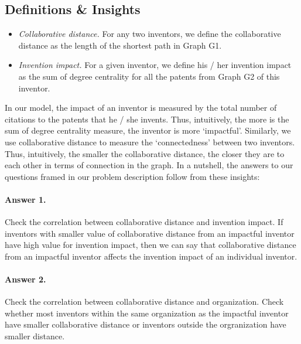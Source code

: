\subsection{Definitions \& Insights}

	\begin{itemize}
	\squish
		\item {\em Collaborative distance.} For any two inventors, we define
		the collaborative distance as the length of the shortest path in
		Graph G1.
		\item {\em Invention impact.} For a given inventor, we define his /
		her invention impact as the sum of degree centrality for
		all the patents from Graph G2 of this inventor.
	\end{itemize}


In our model, the impact of an inventor is measured by the total number of citations
to the patents that he / she invents. Thus, intuitively, the more is the sum of degree
centrality measure, the inventor is more `impactful'. Similarly, we use
collaborative distance to measure the `connectedness' between two inventors.
Thus, intuitively, the smaller the collaborative distance, the closer they are
to each other in terms of connection in the graph.  In a nutshell, the answers
to our questions framed in our problem description follow from these insights:

\paragraph{Answer 1.} Check the correlation between collaborative distance and invention impact.
If inventors with smaller value of collaborative distance from an impactful inventor have 
high value for invention impact, then we can say that collaborative distance from an impactful inventor
affects the invention impact of an individual inventor.

\paragraph{Answer 2.} Check the correlation between collaborative distance and organization.
Check whether most inventors within the same organization as the impactful inventor
have smaller collaborative distance or inventors outside the orgranization have
smaller distance.

